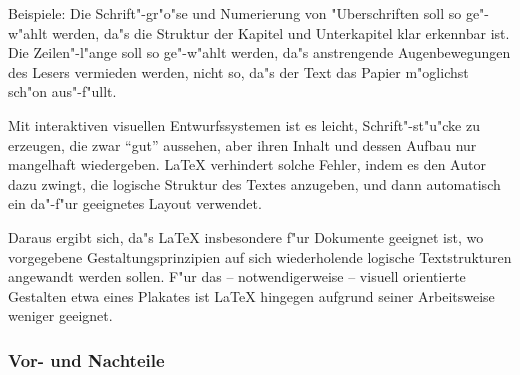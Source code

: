 Beispiele:
Die Schrift"-gr"o"se und Numerierung von "Uberschriften soll so
ge"-w"ahlt werden, da"s die Struktur der Kapitel und Unterkapitel
klar erkennbar ist.
Die Zeilen"-l"ange soll so ge"-w"ahlt werden, da"s anstrengende
Augenbewegungen des Lesers vermieden werden, nicht so, da"s der
Text das Papier m"oglichst sch"on aus"-f"ullt.
 
Mit interaktiven visuellen Entwurfssystemen ist es leicht,  
Schrift"-st"u"cke zu erzeugen, die zwar "`gut"' aussehen,
aber ihren Inhalt und dessen Aufbau nur mangelhaft wiedergeben.
\LaTeX{} verhindert solche
Fehler, indem es den Autor dazu zwingt, die logische
Struktur des Textes anzugeben, und dann automatisch ein da"-f"ur
geeignetes Layout verwendet.

Daraus ergibt sich, da"s \LaTeX{} insbesondere f"ur  Dokumente geeignet 
ist, wo vorgegebene Gestaltungsprinzipien auf sich wiederholende
logische Textstrukturen angewandt werden sollen. 
F"ur das -- notwendigerweise -- visuell orientierte Gestalten
etwa eines Plakates ist \LaTeX{} hingegen 
aufgrund seiner Arbeitsweise weniger geeignet.

\subsubsection{Vor- und Nachteile}

